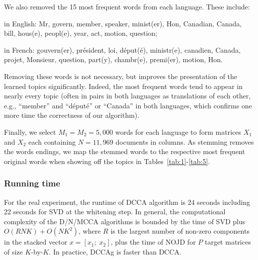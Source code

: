 \documentclass{article}
\newenvironment{mi}{%
  \begin{list}{-}{}
  \let\olditem\item
}{%
  \end{list}
}
\begin{document}
We also removed the 15 most frequent words from each language. These include:
\begin{mi}
\item in English: Mr, govern, member, speaker, minist(er), Hon, Canadian, Canada, bill, hous(e), peopl(e), year, act, motion, question;
\item in French: gouvern(er), pr\'esident, loi, d\'eput(\'e), ministr(e), canadien, Canada, projet, Monsieur, question, part(y), chambr(e), premi(er), motion, Hon.
\end{mi}
Removing these words is not necessary, but improves the presentation of the learned topics significantly. Indeed, the most frequent words tend to appear in nearly every topic (often in pairs in both languages as translations of each other, e.g., ``member'' and ``d\'eput\'e'' or ``Canada'' in both languages, which confirms one more time the correctness of our algorithm).

%

Finally, we select $M_1=M_2=5,000$ words for each language to form matrices $X_1$ and $X_2$ each containing $N=11,969$ documents in columns. As stemming removes the words endings, we map the stemmed words to the respective most frequent original words when showing off the topics in Tables~\ref{tab:1}-\ref{tab:5}.



\subsubsection{Running time} 
\label{app:running-time}
For the real experiment, the runtime of DCCA algorithm is 24 seconds including 22 seconds for SVD at the whitening step. In general, the computational complexity of the D/N/MCCA algorithms is bounded by the time of SVD plus $O(RNK) + O(NK^2)$, where $R$ is the largest number of non-zero components in the stacked vector $x=[x_1;\;x_2]$, plus the time of NOJD for $P$ target matrices of size $K$-by-$K$. In practice, DCCAg is faster than DCCA.







\end{document}
